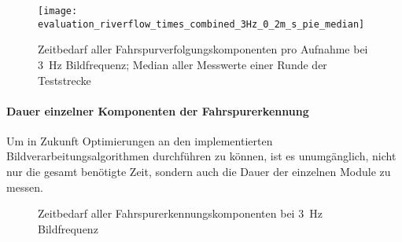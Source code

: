 \begin{figure}[htbp] %
	\centering
	\texttt{[image: evaluation\_riverflow\_times\_combined\_3Hz\_0\_2m\_s\_pie\_median]}
	\label{fig:evaluation:riverflow:times_combined_3Hz_0_2m_s_pie_median}
	\caption{Zeitbedarf aller Fahrspurverfolgungskomponenten pro Aufnahme bei \SI{3}{\hertz} Bildfrequenz; Median aller Messwerte einer Runde der Teststrecke}
\end{figure}


\paragraph{Dauer einzelner Komponenten der Fahrspurerkennung}
Um in Zukunft Optimierungen an den implementierten Bildverarbeitungsalgorithmen durchführen zu können, ist es unumgänglich, nicht nur die gesamt benötigte Zeit, sondern auch die Dauer der einzelnen Module zu messen.

\begin{figure}[htbp] %
\centering
{}
\hfill	
{}
\hfill
\caption{Zeitbedarf aller Fahrspurerkennungskomponenten bei \SI{3}{\hertz} Bildfrequenz}
\end{figure}

